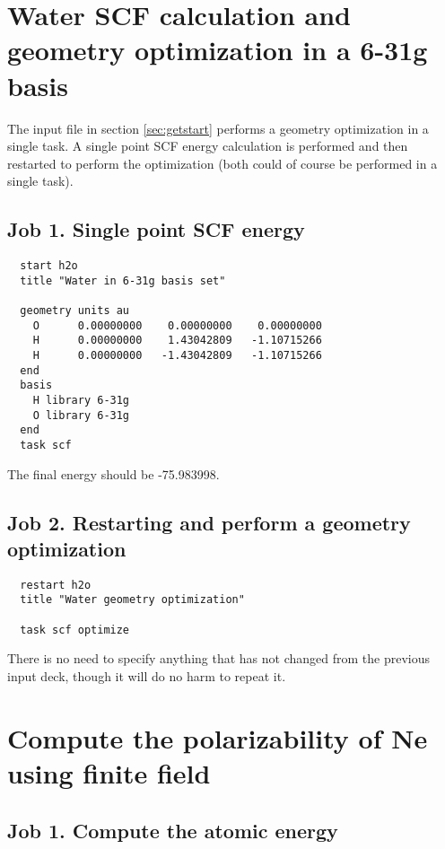\label{sec:sample}
\section{Water SCF calculation and geometry optimization in a 6-31g basis}
\label{sec:sample1}

The input file in section \ref{sec:getstart} performs a geometry optimization
in a single task. A single point SCF energy calculation is performed and then
restarted to perform the optimization (both could of course be
performed in a single task).

\subsection{Job 1.  Single point SCF energy}

\begin{verbatim}
  start h2o
  title "Water in 6-31g basis set"

  geometry units au
    O      0.00000000    0.00000000    0.00000000
    H      0.00000000    1.43042809   -1.10715266
    H      0.00000000   -1.43042809   -1.10715266
  end
  basis
    H library 6-31g
    O library 6-31g
  end
  task scf
\end{verbatim}

The final energy should be -75.983998.

\subsection{Job 2. Restarting and perform a geometry optimization}

\begin{verbatim}
  restart h2o
  title "Water geometry optimization"

  task scf optimize
\end{verbatim}

There is no need to specify anything that has not changed from the
previous input deck, though it will do no harm to repeat it.

\section{Compute the polarizability of Ne using finite field}
\label{sec:sample2}

\subsection{Job 1. Compute the atomic energy}

